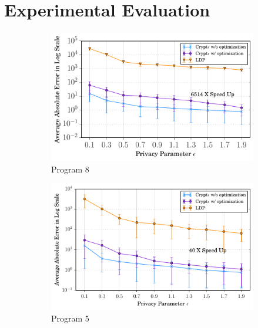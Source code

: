 \section{Experimental Evaluation}
\begin{figure}[ht]

    \begin{subfigure}[b]{0.25\linewidth}
        \centering
         \includegraphics[width=1\linewidth]{t1_final.pdf}
        \caption{ Program 8 }
        \label{fig:P1}
    \end{subfigure}%
    \begin{subfigure}[b]{0.25\linewidth}
    \centering \includegraphics[width=1\linewidth]{t5_final.pdf}
        \caption{Program 5}
        \label{fig:mouse}\end{subfigure}%
    \begin{subfigure}[b]{0.25\linewidth}

\end{subfigure}
\end{figure}
